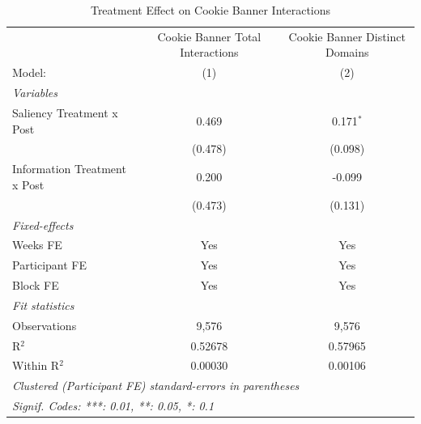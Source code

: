 
\begin{table}[htbp]
   \caption{Treatment Effect on Cookie Banner Interactions}
   \centering
   \begin{tabular}{lcc}
      \tabularnewline \midrule \midrule
                                   & Cookie Banner Total Interactions & Cookie Banner Distinct Domains \\   
      Model:                       & (1)                              & (2)\\  
      \midrule
      \emph{Variables}\\
      Saliency Treatment x Post    & 0.469                            & 0.171$^{*}$\\   
                                   & (0.478)                          & (0.098)\\   
      Information Treatment x Post & 0.200                            & -0.099\\   
                                   & (0.473)                          & (0.131)\\   
      \midrule
      \emph{Fixed-effects}\\
      Weeks FE                     & Yes                              & Yes\\  
      Participant FE               & Yes                              & Yes\\  
      Block FE                     & Yes                              & Yes\\  
      \midrule
      \emph{Fit statistics}\\
      Observations                 & 9,576                            & 9,576\\  
      R$^2$                        & 0.52678                          & 0.57965\\  
      Within R$^2$                 & 0.00030                          & 0.00106\\  
      \midrule \midrule
      \multicolumn{3}{l}{\emph{Clustered (Participant FE) standard-errors in parentheses}}\\
      \multicolumn{3}{l}{\emph{Signif. Codes: ***: 0.01, **: 0.05, *: 0.1}}\\
   \end{tabular}
\end{table}


